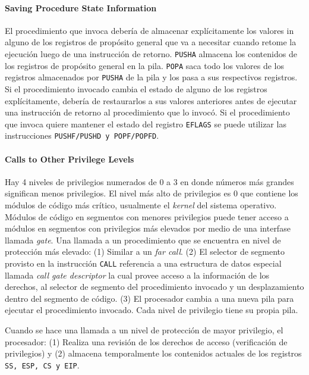 \paragraph{Saving Procedure State Information}  
El procedimiento que invoca debería de almacenar explícitamente los valores in alguno de los registros de propósito general que va a necesitar cuando retome la ejecución luego de una instrucción de retorno. \texttt{PUSHA} almacena los contenidos de los registros de propósito general en la pila. \texttt{POPA} saca todo los valores de los registros almacenados por \texttt{PUSHA} de la pila y los pasa a sus respectivos registros. Si el procedimiento invocado cambia el estado de alguno de los registros explícitamente, debería de restaurarlos a sus valores anteriores antes de ejecutar una instrucción de retorno al procedimiento que lo invocó.
Si el procedimiento que invoca quiere mantener el estado del registro \texttt{EFLAGS} se puede utilizar las instrucciones \texttt{PUSHF/PUSHD \textnormal{y} POPF/POPFD}.

\paragraph{Calls to Other Privilege Levels}
Hay 4 niveles de privilegios numerados de 0 a 3 en donde números más grandes significan menos privilegios. El nivel más alto de privilegios es 0 que contiene los módulos de código más crítico, usualmente el \textit{kernel} del sistema operativo. Módulos de código en segmentos con menores privilegios puede tener acceso a módulos en segmentos con privilegios más elevados por medio de una interfase llamada \textit{gate}. Una llamada a un procedimiento que se encuentra en nivel de protección más elevado: (1) Similar a un \textit{far call}. (2) El selector de segmento provisto en la instrucción \texttt{CALL} referencia a una estructura de datos especial llamada \textit{call gate descriptor} la cual provee acceso a la información de los derechos, al selector de segmento del procedimiento invocado y un desplazamiento dentro del segmento de código. (3) El procesador cambia a una nueva pila para ejecutar el procedimiento invocado. Cada nivel de privilegio tiene su propia pila.

Cuando se hace una llamada a un nivel de protección de mayor privilegio, el procesador: (1) Realiza una revisión de los derechos de acceso (verificación de privilegios) y (2) almacena temporalmente los contenidos actuales de los registros \texttt{SS, ESP, CS \textnormal{y} EIP}.

